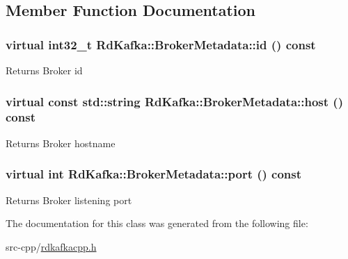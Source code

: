 \subsection{Member Function Documentation}
\hypertarget{classRdKafka_1_1BrokerMetadata_a710a293146153e0432f7424c47b08fe9}{
\subsubsection[{id}]{\setlength{\rightskip}{0pt plus 5cm}virtual int32\_\-t RdKafka::BrokerMetadata::id () const}}
\label{classRdKafka_1_1BrokerMetadata_a710a293146153e0432f7424c47b08fe9}
\begin{DoxyReturn}{Returns}
Broker id 
\end{DoxyReturn}
\hypertarget{classRdKafka_1_1BrokerMetadata_a3aaa8091dc05b48eced63224ceb401fc}{
\subsubsection[{host}]{\setlength{\rightskip}{0pt plus 5cm}virtual const std::string RdKafka::BrokerMetadata::host () const}}
\label{classRdKafka_1_1BrokerMetadata_a3aaa8091dc05b48eced63224ceb401fc}
\begin{DoxyReturn}{Returns}
Broker hostname 
\end{DoxyReturn}
\hypertarget{classRdKafka_1_1BrokerMetadata_a449571140017db5fe1b71512cc645429}{
\subsubsection[{port}]{\setlength{\rightskip}{0pt plus 5cm}virtual int RdKafka::BrokerMetadata::port () const}}
\label{classRdKafka_1_1BrokerMetadata_a449571140017db5fe1b71512cc645429}
\begin{DoxyReturn}{Returns}
Broker listening port 
\end{DoxyReturn}


The documentation for this class was generated from the following file:\begin{DoxyCompactItemize}
\item 
src-\/cpp/\hyperlink{rdkafkacpp_8h}{rdkafkacpp.h}\end{DoxyCompactItemize}
